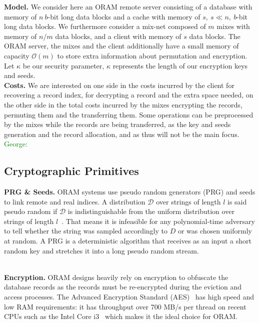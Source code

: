 \documentclass[USenglish,oneside,twocolumn]{article}
\newcommand{\george}[1]{\textcolor{green}{George: #1}}
\begin{document}
\noindent\textbf{Model.} We consider here an ORAM remote server consisting of a database with memory of $n\ b$-bit long data blocks and a cache with memory of $s,\ s\ll n,\ b$-bit long data blocks. We furthermore consider a mix-net composed of $m$ mixes with memory of $n/m$ data blocks, and a client with memory of $s$ data blocks. The ORAM server, the mixes and the client additionally have a small memory of capacity $\mathcal{O}(m)$ to store extra information about permutation and encryption. Let $\kappa$ be our security parameter, $\kappa$ represents the length of our encryption keys and seeds.\\

\noindent\textbf{Costs.} We are interested on one side in the costs incurred by the client for recovering a record index, for decrypting a record and the extra space needed, on the other side in the total costs incurred by the mixes encrypting the records, permuting them and the transferring them.
Some operations can be preprocessed by the mixes while the records are being transferred, as the key and seeds generation and the record allocation, and as thus will not be the main focus. \george{} 
%
\subsection{Cryptographic Primitives}

\noindent\textbf{PRG \& Seeds.}
ORAM systems use  pseudo random generators (PRG) and seeds to link remote and real indices. A distribution $\mathcal{D}$ over strings of length $l$ is said pseudo random if $\mathcal{D}$ is indistinguishable from the uniform distribution over strings of length $l$~\cite{katz2014introduction}. That means it is infeasible for any polynomial-time adversary to tell whether the string was sampled accordingly to $D$ or was chosen uniformly at random. A PRG is a deterministic algorithm that receives as an input a short random key and stretches it into a long pseudo random stream.\\\

\noindent\textbf{Encryption.}
ORAM designs heavily rely on encryption  to obfuscate the database records as the records must be re-encrypted during the eviction and access processes.
The Advanced Encryption Standard (AES)~\cite{daemen2013design} has high speed and low RAM requirements: it has throughput over 700 MB/s per thread on recent CPUs such as the Intel Core i3~\cite{mcwilliams2014hardware} which makes it the ideal choice for ORAM.
\end{document}
